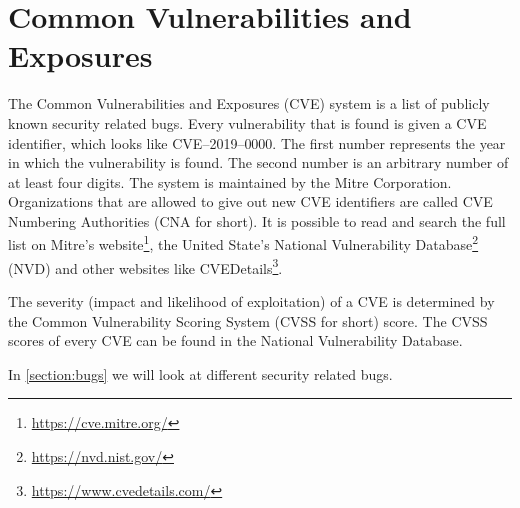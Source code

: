 \section{Common Vulnerabilities and Exposures}
The Common Vulnerabilities and Exposures (CVE) system is a list of publicly known security related bugs. Every vulnerability that is found is given a CVE identifier, which looks like CVE--2019--0000. The first number represents the year in which the vulnerability is found. The second number is an arbitrary number of at least four digits. The system is maintained by the Mitre Corporation. Organizations that are allowed to give out new CVE identifiers are called CVE Numbering Authorities (CNA for short). It is possible to read and search the full list on Mitre's website\footnote{\url{https://cve.mitre.org/}}, the United State's National Vulnerability Database\footnote{\url{https://nvd.nist.gov/}} (NVD) and other websites like CVEDetails\footnote{\url{https://www.cvedetails.com/}}.

\medskip

The severity (impact and likelihood of exploitation) of a CVE is determined by the Common Vulnerability Scoring System (CVSS for short) score. The CVSS scores of every CVE can be found in the National Vulnerability Database.

\medskip

In \autoref{section:bugs} we will look at different security related bugs.
